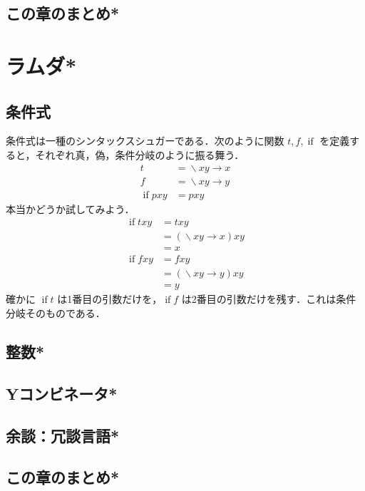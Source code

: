 \documentclass[a4paper,twocolumn]{jsbook}
\DeclareMathOperator{\mIfFunc}{if}
\DeclareMathOperator{\mLambda}{\backslash}
\DeclareMathOperator{\mLambdaArrow}{\rightarrow}
\newcommand{\mLambdaExp}[2]{\mLambda{#1}\mLambdaArrow{#2}}
\begin{document}
\section{この章のまとめ*}


\chapter{ラムダ*}

\section{条件式}

条件式は一種のシンタックスシュガーである．次のように関数 $t,f,\mIfFunc$ を定義すると，それぞれ真，偽，条件分岐のように振る舞う．
\begin{align}
t&=\mLambdaExp{xy}{x}\\
f&=\mLambdaExp{xy}{y}\\
\mIfFunc pxy&=pxy
\end{align}
本当かどうか試してみよう．
\begin{align}
\mIfFunc txy&=txy\\
&=(\mLambdaExp{xy}{x})xy\\
&=x\\
\mIfFunc fxy&=fxy\\
&=(\mLambdaExp{xy}{y})xy\\
&=y
\end{align}
確かに $\mIfFunc t$ は1番目の引数だけを，$\mIfFunc f$ は2番目の引数だけを残す．これは条件分岐そのものである．

\section{整数*}
\section{Yコンビネータ*}


\section{余談：冗談言語*}


\section{この章のまとめ*}
\end{document}
